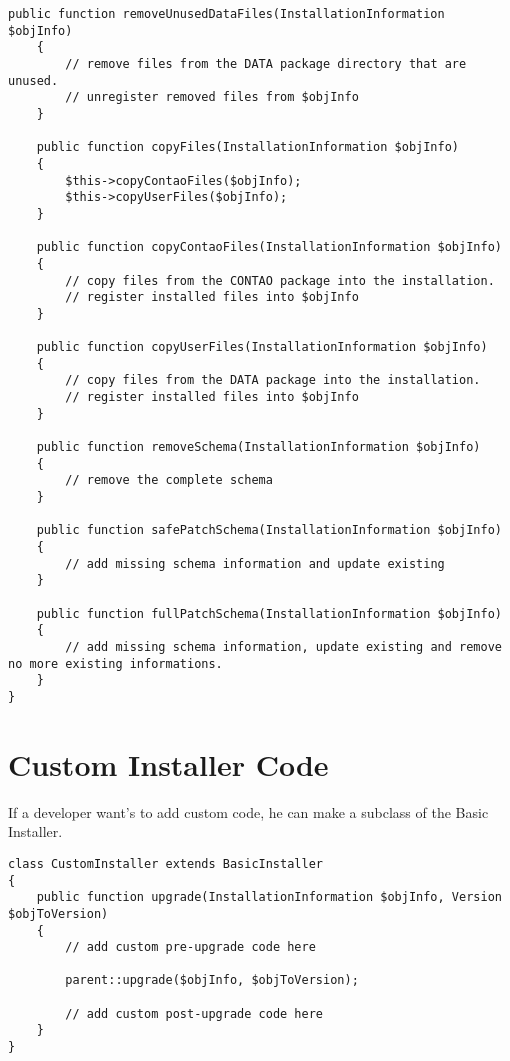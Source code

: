 \begin{lstlisting}[caption=Basic Installer Implementation Code]
	public function removeUnusedDataFiles(InstallationInformation $objInfo)
	{
		// remove files from the DATA package directory that are unused.
		// unregister removed files from $objInfo
	}
	
	public function copyFiles(InstallationInformation $objInfo)
	{
		$this->copyContaoFiles($objInfo);
		$this->copyUserFiles($objInfo);
	}
	
	public function copyContaoFiles(InstallationInformation $objInfo)
	{
		// copy files from the CONTAO package into the installation.
		// register installed files into $objInfo
	}
	
	public function copyUserFiles(InstallationInformation $objInfo)
	{
		// copy files from the DATA package into the installation.
		// register installed files into $objInfo
	}
	
	public function removeSchema(InstallationInformation $objInfo)
	{
		// remove the complete schema
	}
	
	public function safePatchSchema(InstallationInformation $objInfo)
	{
		// add missing schema information and update existing
	}
	
	public function fullPatchSchema(InstallationInformation $objInfo)
	{
		// add missing schema information, update existing and remove no more existing informations.
	}
}
\end{lstlisting}

\section[sec:custom installer code]{Custom Installer Code}

If a developer want's to add custom code, he can make a subclass of the Basic Installer.

\begin{lstlisting}[caption=Custom Installer Code Example]
class CustomInstaller extends BasicInstaller
{
	public function upgrade(InstallationInformation $objInfo, Version $objToVersion)
	{
		// add custom pre-upgrade code here
		
		parent::upgrade($objInfo, $objToVersion);
		
		// add custom post-upgrade code here
	}	
}
\end{lstlisting}
